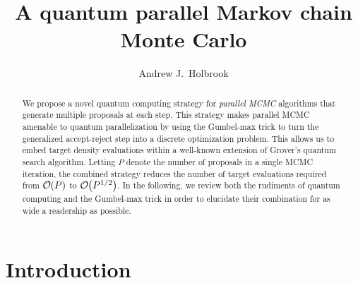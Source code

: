 \documentclass[12pt]{article} %
\title{A quantum parallel Markov chain Monte Carlo}
\date{}
\author{Andrew J.~Holbrook}
\affil{UCLA Biostatistics}
\newcommand{\order}[1]{{\cal O}\hspace{-0.2em}\left( #1 \right)}
\begin{document}
\maketitle




\begin{abstract}

We propose a novel quantum computing strategy for \emph{parallel MCMC} algorithms that generate multiple proposals at each step. This strategy makes parallel MCMC amenable to quantum parallelization by using the Gumbel-max trick to turn the generalized accept-reject step into a discrete optimization problem.  This allows us to embed target density evaluations within a well-known extension of Grover's quantum search algorithm.  Letting $P$ denote the number of proposals in a single MCMC iteration, the combined strategy reduces the number of target evaluations required from $\order{P}$ to $\order{P^{1/2}}$.  In the following, we review both the rudiments of quantum computing and the Gumbel-max trick in order to elucidate their combination for as wide a readership as possible. 


\end{abstract}


\section{Introduction}

\newcommand{\ttheta}{\boldsymbol{\theta}}
\newcommand{\Ttheta}{\boldsymbol{\Theta}}
\newcommand{\dd}{\mbox{d}}
\newcommand{\ppsi}{\boldsymbol{\psi}}
\newcommand{\U}{\mathbf{U}}
\newcommand{\I}{\mathbf{I}}
\renewcommand{\H}{\mathbf{H}}
\newcommand{\A}{\mathbf{A}}
\newcommand{\B}{\mathbf{B}}
\newcommand{\G}{\mathbf{G}}
\newcommand{\ppi}{\boldsymbol{\pi}}
\newcommand{\llambda}{\boldsymbol{\lambda}}
\end{document}
